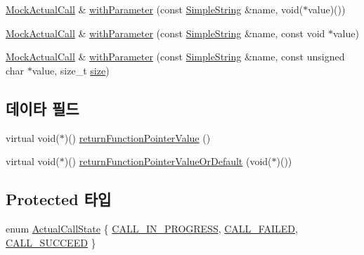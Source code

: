 \begin{DoxyCompactItemize}
\item 
\hyperlink{class_mock_actual_call}{Mock\+Actual\+Call} \& \hyperlink{class_mock_actual_call_a2179debe76f390842cb8f94786273f8d}{with\+Parameter} (const \hyperlink{class_simple_string}{Simple\+String} \&name, void($\ast$value)())
\item 
\hyperlink{class_mock_actual_call}{Mock\+Actual\+Call} \& \hyperlink{class_mock_actual_call_a3d3f4588e0e927961590b55e117e898f}{with\+Parameter} (const \hyperlink{class_simple_string}{Simple\+String} \&name, const void $\ast$value)
\item 
\hyperlink{class_mock_actual_call}{Mock\+Actual\+Call} \& \hyperlink{class_mock_actual_call_a59ab8948e17207f3bb15facb8869e266}{with\+Parameter} (const \hyperlink{class_simple_string}{Simple\+String} \&name, const unsigned char $\ast$value, size\+\_\+t \hyperlink{gst__avb__playbin_8c_a439227feff9d7f55384e8780cfc2eb82}{size})
\end{DoxyCompactItemize}
\subsection*{데이타 필드}
\begin{DoxyCompactItemize}
\item 
virtual void($\ast$)() \hyperlink{class_mock_checked_actual_call_abd8adc7ad48025440b2a4aee485f560d}{return\+Function\+Pointer\+Value} ()
\item 
virtual void($\ast$)() \hyperlink{class_mock_checked_actual_call_af9c6303587f8f06ff55e48340ee3db5e}{return\+Function\+Pointer\+Value\+Or\+Default} (void($\ast$)())
\end{DoxyCompactItemize}
\subsection*{Protected 타입}
\begin{DoxyCompactItemize}
\item 
enum \hyperlink{class_mock_checked_actual_call_a51287301ad26cf1a31a1e33a4fd76e8c}{Actual\+Call\+State} \{ \hyperlink{class_mock_checked_actual_call_a51287301ad26cf1a31a1e33a4fd76e8ca4a60ea44a546fda90c0ec88ff6c185cf}{C\+A\+L\+L\+\_\+\+I\+N\+\_\+\+P\+R\+O\+G\+R\+E\+SS}, 
\hyperlink{class_mock_checked_actual_call_a51287301ad26cf1a31a1e33a4fd76e8ca32a41d0772212c056a27866f669e22a8}{C\+A\+L\+L\+\_\+\+F\+A\+I\+L\+ED}, 
\hyperlink{class_mock_checked_actual_call_a51287301ad26cf1a31a1e33a4fd76e8cab0fdde6eb7a0176697969df8f7044850}{C\+A\+L\+L\+\_\+\+S\+U\+C\+C\+E\+ED}
 \}
\end{DoxyCompactItemize}

